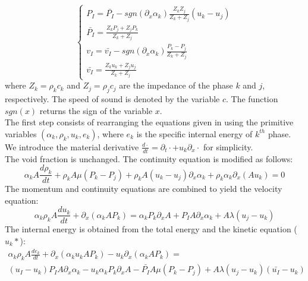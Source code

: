 \begin{equation}
\label{eq:sev_equ2-app}
\left\{
\begin{array}{lll}
P_I = \bar{P_I} - sgn\left( \partial_x \alpha_k \right) \frac{Z_k Z_j}{Z_k + Z_j} \left( u_k-u_j \right) \\
\bar{P_I} = \frac{Z_k P_j + Z_j P_k}{Z_k + Z_j} \\
v_I = \bar{v_I} - sgn\left( \partial_x \alpha_k \right) \frac{P_k - P_j}{Z_k + Z_j} \\
\bar{v_I} = \frac{Z_k u _k + Z_j u_j}{Z_k + Z_j}
\end{array}
\right.
\end{equation}
where $Z_k = \rho_k c_k$ and $Z_j = \rho_j c_j$ are the impedance of the phase $k$ and $j$, respectively. The speed of sound is denoted by the variable $c$. The function $sgn(x)$ returns the sign of the variable $x$.\\
The first step consists of rearranging the equations given in  using the primitive variables $(\alpha_k, \rho_k, u_k, e_k)$, where $e_k$ is the specific internal energy of $k^{th}$ phase. We introduce the material derivative $\frac{d \cdot}{dt} = \partial_t \cdot + u_k \partial_x \cdot$ for simplicity. \\
The void fraction is unchanged. The continuity equation is modified as follows:
\begin{equation}
\label{eq:cont1-app}
\alpha_k A \frac{d \rho_k}{dt} + \rho_k A \mu \left( P_k-P_j \right) + \rho_k A \left( u_k-u_j \right) \partial_x \alpha_k + \rho_k \alpha_k \partial_x \left( A u_k \right) = 0
\end{equation}
The momentum and continuity equations are combined to yield the velocity equation:
\begin{equation}
\label{eq:vel1-app}
\alpha_k \rho_k A \frac{du_k}{dt} + \partial_x \left( \alpha_k A P_k \right) = \alpha_k P_k \partial_x A + P_I A \partial_x \alpha_k + A \lambda \left( u_j-u_k \right)
\end{equation}
The internal energy is obtained from the total energy and the kinetic equation ($u_k * $):
\begin{eqnarray}
\label{eq:internal1}
\alpha_k \rho_k A \frac{d e_k}{dt} + \partial_x \left( \alpha_k u_k A P_k \right) - u_k \partial_x \left( \alpha_k A P_k \right) =\nonumber \\ \left(u_I-u_k \right) P_I A \partial_x \alpha_k - u_k \alpha_k P_k \partial_x A 
 - \bar{P_I} A \mu \left(P_k-P_j \right) + A \lambda \left(u_j-u_k  \right) \left(\bar{u_I}-u_k \right)
\end{eqnarray}
